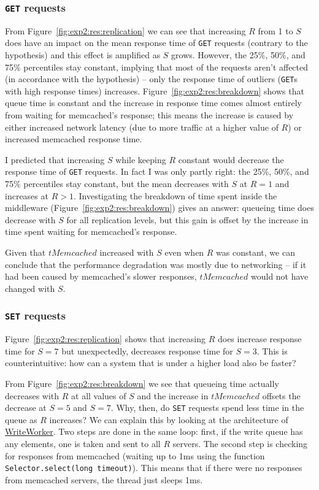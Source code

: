 \documentclass[11pt]{article}
\newcommand{\get}[0]{\texttt{GET}}
\newcommand{\set}[0]{\texttt{SET}}
\newcommand{\linkmain}[1]{\href{https://gitlab.inf.ethz.ch/pungast/asl-fall16-project/blob/master/src/main/java/asl/#1.java}{#1}}
\begin{document}
\subsubsection{\get{} requests}
From Figure~\ref{fig:exp2:res:replication} we can see that increasing $R$ from 1 to $S$ does have an impact on the mean response time of \get{} requests (contrary to the hypothesis) and this effect is amplified as $S$ grows. However, the 25\%, 50\%, and 75\% percentiles stay constant, implying that most of the requests aren't affected (in accordance with the hypothesis) -- only the response time of outliers (\get{}s with high response times) increases. Figure~\ref{fig:exp2:res:breakdown} shows that queue time is constant and the increase in response time comes almost entirely from waiting for memcached's response; this means the increase is caused by either increased network latency (due to more traffic at a higher value of $R$) or increased memcached response time.

I predicted that increasing $S$ while keeping $R$ constant would decrease the response time of \get{} requests. In fact I was only partly right: the 25\%, 50\%, and 75\% percentiles stay constant, but the mean decreases with $S$ at $R=1$ and increases at $R>1$. Investigating the breakdown of time spent inside the middleware (Figure~\ref{fig:exp2:res:breakdown}) gives an answer: queueing time does decrease with $S$ for all replication levels, but this gain is offset by the increase in time spent waiting for memcached's response.

Given that $tMemcached$ increased with $S$ even when $R$ was constant, we can conclude that the performance degradation was mostly due to networking -- if it had been caused by memcached's slower responses, $tMemcached$ would not have changed with $S$.

\subsubsection{\set{} requests}
\label{sec:exp2:res:set}

Figure~\ref{fig:exp2:res:replication} shows that increasing $R$ does increase response time for $S=7$ but unexpectedly, decreases response time for $S=3$. This is counterintuitive: how can a system that is under a higher load also be faster?

From Figure~\ref{fig:exp2:res:breakdown} we see that queueing time actually decreases with $R$ at all values of $S$ and the increase in $tMemcached$ offsets the decrease at $S=5$ and $S=7$. Why, then, do \set{} requests spend less time in the queue as $R$ increases? We can explain this by looking at the architecture of \linkmain{WriteWorker}. Two steps are done in the same loop: first, if the write queue has any elements, one is taken and sent to all $R$ servers. The second step is checking for responses from memcached (waiting up to 1ms using the function \verb+Selector.select(long timeout)+). This means that if there were no responses from memcached servers, the thread just sleeps 1ms.
\end{document}
